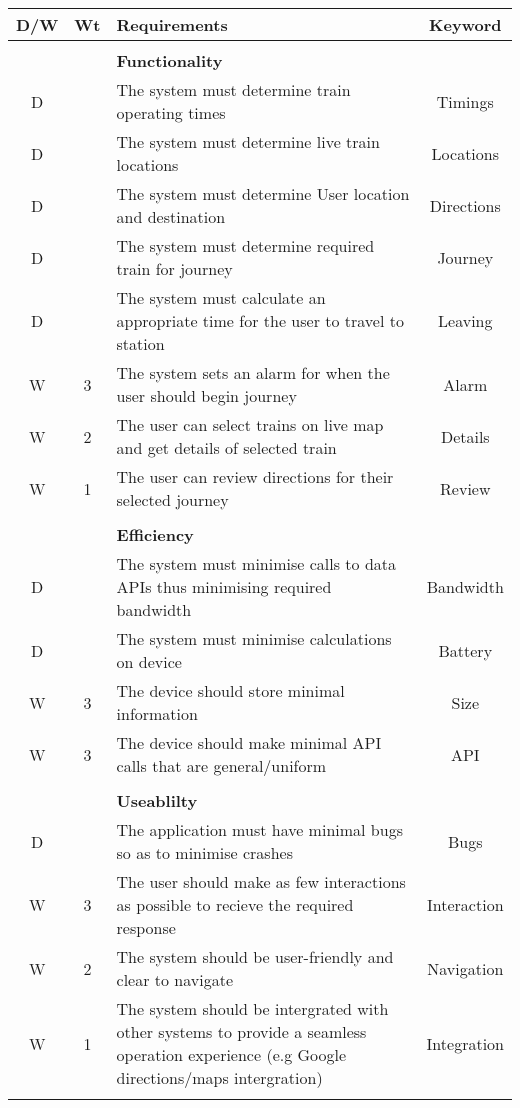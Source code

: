 \documentclass[paper=a4, fontsize=12pt]{scrartcl} %
\numberwithin{equation}{section} %
\numberwithin{figure}{section} %
\numberwithin{table}{section} %
\begin{document}
        \begin{center}
        \begin{tabular}{|| c | c || p{12cm} || c ||}
            \hline
            \textbf{D/W} & \textbf{Wt} & \textbf{Requirements} & \textbf{Keyword} \\
            \hline
            &&&\\
            && \textbf{Functionality} & \\
            \hline
            D && The system must determine train operating times & Timings \\
            D && The system must determine live train locations & Locations \\
            D && The system must determine User location and destination &  Directions \\
            D && The system must determine required train for journey & Journey \\
            D && The system must calculate an appropriate time for the user to travel to station & Leaving \\

            W & 3 & The system sets an alarm for when the user should begin journey & Alarm \\
            W & 2 & The user can select trains on live map and get details of selected train & Details \\
            W & 1 & The user can review directions for their selected journey & Review \\
            &&&\\

            && \textbf{Efficiency} & \\
            \hline
            D && The system must minimise calls to data APIs thus minimising required bandwidth & Bandwidth \\
            D && The system must minimise calculations on device & Battery \\
            W & 3 & The device should store minimal information & Size \\
            W & 3 & The device should make minimal API calls that are general/uniform & API \\
            &&&\\

            && \textbf{Useablilty} & \\
            \hline
            D && The application must have minimal bugs so as to minimise crashes & Bugs \\
            W & 3 & The user should make as few interactions as possible to recieve the required response & Interaction \\
            W & 2 & The system should be user-friendly and clear to navigate & Navigation \\
            W & 1 & The system should be intergrated with other systems to provide a seamless operation experience (e.g Google directions/maps intergration) & Integration \\
            &&&\\


\end{tabular}
\end{center}
\end{document}
